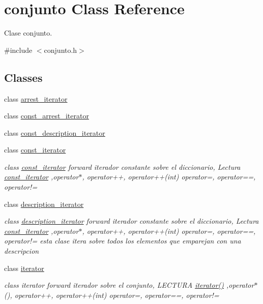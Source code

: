 \hypertarget{classconjunto}{\section{conjunto Class Reference}
\label{classconjunto}
}


Clase conjunto.  




{\ttfamily \#include $<$conjunto.\-h$>$}

\subsection*{Classes}
\begin{DoxyCompactItemize}
\item 
class \hyperlink{classconjunto_1_1arrest__iterator}{arrest\-\_\-iterator}
\item 
class \hyperlink{classconjunto_1_1const__arrest__iterator}{const\-\_\-arrest\-\_\-iterator}
\item 
class \hyperlink{classconjunto_1_1const__description__iterator}{const\-\_\-description\-\_\-iterator}
\item 
class \hyperlink{classconjunto_1_1const__iterator}{const\-\_\-iterator}
\begin{DoxyCompactList}\small\item\em class \hyperlink{classconjunto_1_1const__iterator}{const\-\_\-iterator} forward iterador constante sobre el diccionario, Lectura \hyperlink{classconjunto_1_1const__iterator}{const\-\_\-iterator} ,operator$\ast$, operator++, operator++(int) operator=, operator==, operator!= \end{DoxyCompactList}\item 
class \hyperlink{classconjunto_1_1description__iterator}{description\-\_\-iterator}
\begin{DoxyCompactList}\small\item\em class \hyperlink{classconjunto_1_1description__iterator}{description\-\_\-iterator} forward iterador constante sobre el diccionario, Lectura \hyperlink{classconjunto_1_1const__iterator}{const\-\_\-iterator} ,operator$\ast$, operator++, operator++(int) operator=, operator==, operator!= esta clase itera sobre todos los elementos que emparejan con una descripcion \end{DoxyCompactList}\item 
class \hyperlink{classconjunto_1_1iterator}{iterator}
\begin{DoxyCompactList}\small\item\em class iterator forward iterador sobre el conjunto, L\-E\-C\-T\-U\-R\-A \hyperlink{classconjunto_1_1iterator_ae3ade272e78f6888c39ad44a8b4b152a}{iterator()} ,operator$\ast$(), operator++, operator++(int) operator=, operator==, operator!= \end{DoxyCompactList}\end{DoxyCompactItemize}
